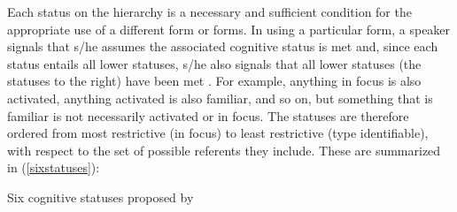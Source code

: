 \begin{table} 

\caption{{Givenness Hierarchy (Gundel et. al.1993)}}
\label{givennesshierarchy} 

\end{table}
Each status on the hierarchy is a necessary and sufficient condition for the appropriate use of a different form or forms. In using a particular form, a speaker signals that s/he assumes the associated cognitive status is met and, since each status entails all lower statuses, s/he also signals that all lower statuses (the statuses to the right) have been met \citep[275]{gundel1993}. For example, anything in focus is also activated, anything activated is also familiar, and so on, but something that is familiar is not necessarily activated or in focus. The statuses are therefore ordered from most restrictive (in focus) to least restrictive (type identifiable), with respect to the set of possible referents they include. These are summarized in (\ref{sixstatuses}):

\ea\label{sixstatuses} Six cognitive statuses proposed by \citet{gundel1993}

